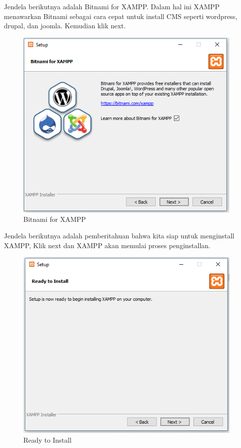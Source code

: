 Jendela berikutnya adalah Bitnami for XAMPP. Dalam hal ini XAMPP menawarkan Bitnami sebagai cara cepat untuk install CMS seperti wordpress, drupal, dan joomla. Kemudian klik next.

\begin{figure}[h]
\centering
\includegraphics[scale=0.5]{figures/bitnamiforxampp}
\caption{Bitnami for XAMPP}
\end{figure}

Jendela berikutnya adalah pemberitahuan bahwa kita siap untuk menginstall XAMPP, Klik next dan XAMPP akan memulai  proses penginstallan.

\begin{figure}[h]
\centering
\includegraphics[scale=0.5]{figures/readytoinstall}
\caption{Ready to Install}
\end{figure}

